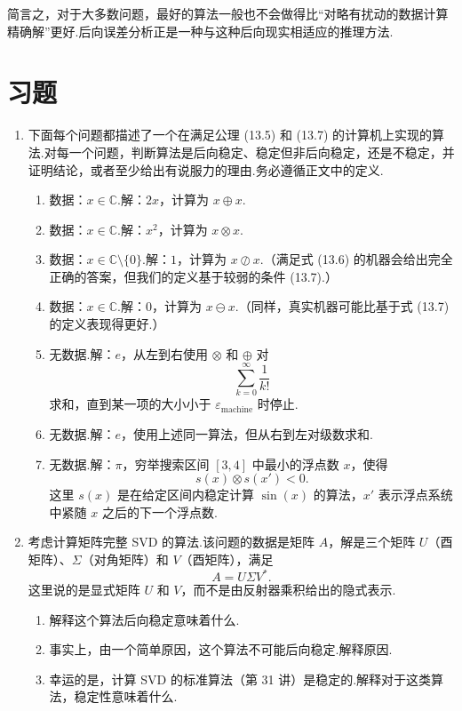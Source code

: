 \documentclass[UTF8,fontset=none,12pt]{ctexart}
\newcommand{\C}{\mathbb{C}}
\newcommand{\epsmach}{\varepsilon_{\mathrm{machine}}}
\theoremstyle{definition}
\begin{document}
简言之，对于大多数问题，最好的算法一般也不会做得比“对略有扰动的数据计算精确解”更好.后向误差分析正是一种与这种后向现实相适应的推理方法.

\section*{习题}

\begin{enumerate}[label=\textbf{15.\arabic*}]
    \item 下面每个问题都描述了一个在满足公理 (13.5) 和 (13.7) 的计算机上实现的算法.对每一个问题，判断算法是后向稳定、稳定但非后向稳定，还是不稳定，并证明结论，或者至少给出有说服力的理由.务必遵循正文中的定义.
    \begin{enumerate}[label=(\alph*)]
        \item 数据：$x\in\C$.解：$2x$，计算为 $x\oplus x$.
        \item 数据：$x\in\C$.解：$x^2$，计算为 $x\otimes x$.
        \item 数据：$x\in\C\setminus\{0\}$.解：$1$，计算为 $x\oslash x$.（满足式 (13.6) 的机器会给出完全正确的答案，但我们的定义基于较弱的条件 (13.7).）
        \item 数据：$x\in\C$.解：$0$，计算为 $x\ominus x$.（同样，真实机器可能比基于式 (13.7) 的定义表现得更好.）
        \item 无数据.解：$e$，从左到右使用 $\otimes$ 和 $\oplus$ 对
        \[
            \sum_{k=0}^{\infty}\frac1{k!}
        \]
        求和，直到某一项的大小小于 $\epsmach$ 时停止.
        \item 无数据.解：$e$，使用上述同一算法，但从右到左对级数求和.
        \item 无数据.解：$\pi$，穷举搜索区间 $[3,4]$ 中最小的浮点数 $x$，使得
        \[
            s(x)\otimes s(x')<0.
        \]
        这里 $s(x)$ 是在给定区间内稳定计算 $\sin(x)$ 的算法，$x'$ 表示浮点系统中紧随 $x$ 之后的下一个浮点数.
    \end{enumerate}

    \item 考虑计算矩阵完整 SVD 的算法.该问题的数据是矩阵 $A$，解是三个矩阵 $U$（酉矩阵）、$\Sigma$（对角矩阵）和 $V$（酉矩阵），满足
    \[
        A=U\Sigma V^*.
    \]
    这里说的是显式矩阵 $U$ 和 $V$，而不是由反射器乘积给出的隐式表示.
    \begin{enumerate}[label=(\alph*)]
        \item 解释这个算法后向稳定意味着什么.
        \item 事实上，由一个简单原因，这个算法不可能后向稳定.解释原因.
        \item 幸运的是，计算 SVD 的标准算法（第 31 讲）是稳定的.解释对于这类算法，稳定性意味着什么.
    \end{enumerate}
\end{enumerate}
\end{document}
